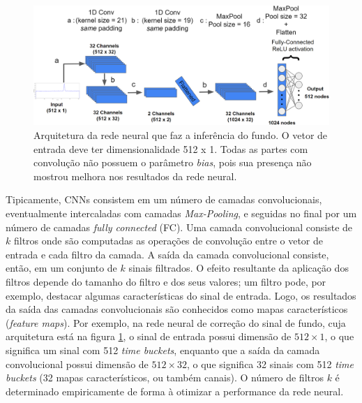 \documentclass[a4paper,12pt,oneside]{book}
\begin{document}


\begin{figure}[H]
    \centering
    \includegraphics[scale = 0.238]{figs/Source to only bkg.png}
    \caption{Arquitetura da rede neural que faz a inferência do fundo. O vetor de entrada deve ter dimensionalidade 512 x 1. Todas as partes com convolução não possuem o parâmetro \textit{bias}, pois sua presença não mostrou melhora nos resultados da rede neural.}
    \label{fig:arq_source_to_bkg}
\end{figure}

\par Tipicamente, CNNs consistem em um número de camadas convolucionais, eventualmente intercaladas com camadas \textit{Max-Pooling}, e seguidas no final por um número de camadas \textit{fully connected} (FC). Uma camada convolucional consiste de $k$ filtros onde são computadas as operações de convolução entre o vetor de entrada e cada filtro da camada. A saída da camada convolucional consiste, então, em um conjunto de $k$ sinais filtrados. O efeito resultante da aplicação dos filtros depende do tamanho do filtro e dos seus valores; um filtro pode, por exemplo, destacar algumas características do sinal de entrada. Logo, os resultados da saída das camadas convolucionais são conhecidos como mapas característicos (\textit{feature maps}). Por exemplo, na rede neural de correção do sinal de fundo, cuja arquitetura está na figura \ref{fig:arq_source_to_bkg}, o sinal de entrada possui dimensão de $512\times 1$, o que significa um sinal com 512 \textit{time buckets}, enquanto que a saída da camada convolucional possui dimensão de $512\times 32$, o que significa 32 sinais com 512 \textit{time buckets} (32 mapas característicos, ou também canais). O número de filtros $k$ é determinado empiricamente de forma à otimizar a performance da rede neural.
\end{document}
